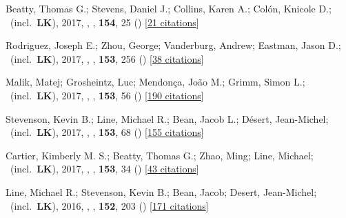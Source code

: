 \item[{\color{numcolor}\scriptsize15}] Beatty, Thomas G.; Stevens, Daniel J.; Collins, Karen A.; Col{\'o}n, Knicole D.; \etal\ (incl.\ \textbf{LK}), 2017, , \aj, \textbf{154}, 25 () [\href{https://ui.adsabs.harvard.edu/abs/2017AJ....154...25B}{21 citations}]

\item[{\color{numcolor}\scriptsize14}] Rodriguez, Joseph E.; Zhou, George; Vanderburg, Andrew; Eastman, Jason D.; \etal\ (incl.\ \textbf{LK}), 2017, , \aj, \textbf{153}, 256 () [\href{https://ui.adsabs.harvard.edu/abs/2017AJ....153..256R}{38 citations}]

\item[{\color{numcolor}\scriptsize13}] Malik, Matej; Grosheintz, Luc; Mendon{\c{c}}a, Jo{\~a}o M.; Grimm, Simon L.; \etal\ (incl.\ \textbf{LK}), 2017, , \aj, \textbf{153}, 56 () [\href{https://ui.adsabs.harvard.edu/abs/2017AJ....153...56M}{190 citations}]

\item[{\color{numcolor}\scriptsize12}] Stevenson, Kevin B.; Line, Michael R.; Bean, Jacob L.; D{\'e}sert, Jean-Michel; \etal\ (incl.\ \textbf{LK}), 2017, , \aj, \textbf{153}, 68 () [\href{https://ui.adsabs.harvard.edu/abs/2017AJ....153...68S}{155 citations}]

\item[{\color{numcolor}\scriptsize11}] Cartier, Kimberly M. S.; Beatty, Thomas G.; Zhao, Ming; Line, Michael; \etal\ (incl.\ \textbf{LK}), 2017, , \aj, \textbf{153}, 34 () [\href{https://ui.adsabs.harvard.edu/abs/2017AJ....153...34C}{43 citations}]

\item[{\color{numcolor}\scriptsize10}] Line, Michael R.; Stevenson, Kevin B.; Bean, Jacob; Desert, Jean-Michel; \etal\ (incl.\ \textbf{LK}), 2016, , \aj, \textbf{152}, 203 () [\href{https://ui.adsabs.harvard.edu/abs/2016AJ....152..203L}{171 citations}]


